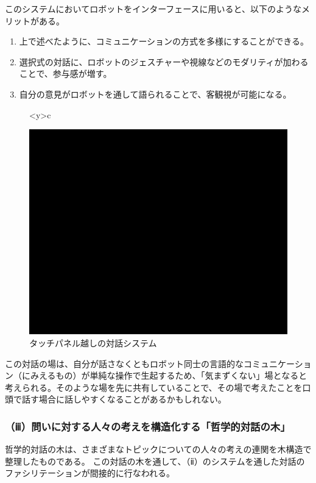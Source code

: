 \documentclass[b5j,twoside,twocolumn]{utarticle}
\begin{document}
このシステムにおいてロボットをインターフェースに用いると、以下のようなメリットがある。
\begin{enumerate}
\renewcommand{\labelenumi}{\pbox<y>{(\arabic{enumi})}}
\item 上で述べたように、コミュニケーションの方式を多様にすることができる。
\item 選択式の対話に、ロボットのジェスチャーや視線などのモダリティが加わることで、参与感が増す。
\item 自分の意見がロボットを通して語られることで、客観視が可能になる。
\end{enumerate}


\begin{figure}[h]
\centering
\begin{tabular}<y>{c}
\centering
\begin{minipage}[c]{0.65\hsize}
\centering
\includegraphics[scale=0.55]{system2}
\caption{タッチパネル越しの対話システム}
\end{minipage}
\end{tabular}
\end{figure}

この対話の場は、自分が話さなくともロボット同士の言語的なコミュニケーション（にみえるもの）が単純な操作で生起するため、「気まずくない」場となると考えられる。そのような場を先に共有していることで、その場で考えたことを口頭で話す場合に話しやすくなることがあるかもしれない。




\subsubsection*{（ⅲ）問いに対する人々の考えを構造化する「哲学的対話の木」}
哲学的対話の木は、さまざまなトピックについての人々の考えの連関を木構造で整理したものである。
この対話の木を通して、（ⅱ）のシステムを通した対話のファシリテーションが間接的に行なわれる。
\end{document}
